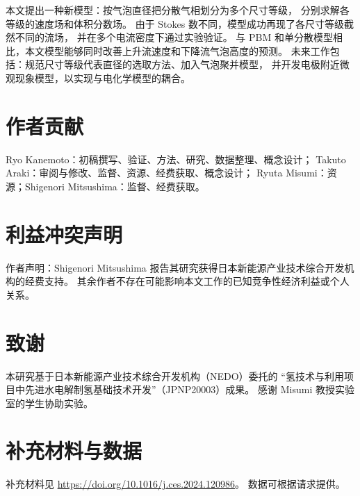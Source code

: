 \documentclass[UTF8,zihao=-4,fontset=fandol]{ctexart}
\begin{document}
本文提出一种新模型：按气泡直径把分散气相划分为多个尺寸等级，
分别求解各等级的速度场和体积分数场。
由于 Stokes 数不同，模型成功再现了各尺寸等级截然不同的流场，
并在多个电流密度下通过实验验证。
与 PBM 和单分散模型相比，本文模型能够同时改善上升流速度和下降流气泡高度的预测。
未来工作包括：规范尺寸等级代表直径的选取方法、加入气泡聚并模型，
并开发电极附近微观现象模型，以实现与电化学模型的耦合。

\section*{作者贡献}
Ryo Kanemoto：初稿撰写、验证、方法、研究、数据整理、概念设计；
Takuto Araki：审阅与修改、监督、资源、经费获取、概念设计；
Ryuta Misumi：资源；Shigenori Mitsushima：监督、经费获取。

\section*{利益冲突声明}
作者声明：Shigenori Mitsushima 报告其研究获得日本新能源产业技术综合开发机构的经费支持。
其余作者不存在可能影响本文工作的已知竞争性经济利益或个人关系。

\section*{致谢}
本研究基于日本新能源产业技术综合开发机构（NEDO）委托的
“氢技术与利用项目中先进水电解制氢基础技术开发”（JPNP20003）成果。
感谢 Misumi 教授实验室的学生协助实验。

\section*{补充材料与数据}
补充材料见 \url{https://doi.org/10.1016/j.ces.2024.120986}。
数据可根据请求提供。
\end{document}
